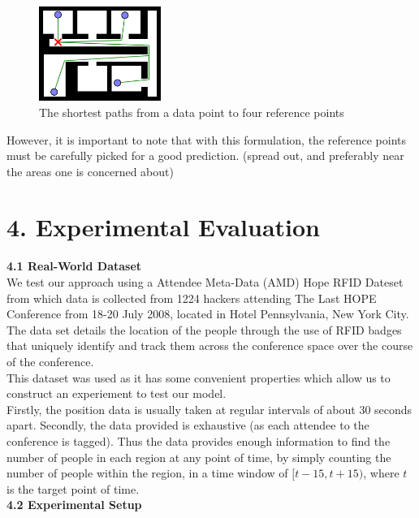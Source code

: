 \documentclass[letterpaper]{article}
\begin{document}
\begin{figure}[h!]
  \centering
    \includegraphics[width=150px,natwidth=570,natheight=442]{shortestpaths.png}
  \caption{The shortest paths from a data point to four reference points}
  \label{fig:spaths}
\end{figure}

However, it is important to note that with this formulation, the reference points must be carefully picked for a good prediction. (spread out, and preferably near the areas one is concerned about) \\

\section{4.  Experimental Evaluation}

{\bf4.1  Real-World Dataset} \\

We test our approach using a Attendee Meta-Data (AMD) Hope RFID Dateset from which data is collected from 1224 hackers attending The Last HOPE Conference from 18-20 July 2008, located in Hotel Pennsylvania, New York City. The data set details the location of the people through the use of RFID badges that uniquely identify and track them across the conference space over the course of the conference. \\

This dataset was used as it has some convenient properties which allow us to construct an experiement to test our model.\\

Firstly, the position data is usually taken at regular intervals of about $30$ seconds apart. Secondly, the data provided is exhaustive (as each attendee to the conference is tagged). Thus the data provides enough information to find the number of people in each region at any point of time, by simply counting the number of people within the region, in a time window of $[t-15,t+15)$, where $t$ is the target point of time. \\

{\bf4.2  Experimental Setup} \\
\end{document}
